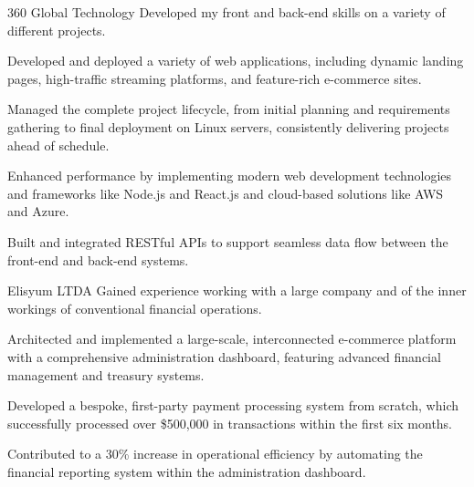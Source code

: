 \begin{experience}{360 Global Technology}{
}
Developed my front and back-end skills on a variety of different projects.\\
\begin{contribs}
	\item{Developed and deployed a variety of web applications, including dynamic landing pages, high-traffic streaming platforms, and feature-rich e-commerce sites.}
	\item{Managed the complete project lifecycle, from initial planning and requirements gathering to final deployment on Linux servers, consistently delivering projects ahead of schedule.}
	\item{Enhanced performance by implementing modern web development technologies and frameworks like Node.js and React.js and cloud-based solutions like AWS and Azure.}
	\item{Built and integrated RESTful APIs to support seamless data flow between the front-end and back-end systems.}
\end{contribs}

\end{experience}

\begin{experience}[last]{Elisyum LTDA}{
}
Gained experience working with a large company and of the inner workings of conventional financial operations.\\
\begin{contribs}
	\item{Architected and implemented a large-scale, interconnected e-commerce platform with a comprehensive administration dashboard, featuring advanced financial management and treasury systems.}
	\item{Developed a bespoke, first-party payment processing system from scratch, which successfully processed over \$500,000 in transactions within the first six months.}
	\item{Contributed to a 30\% increase in operational efficiency by automating the financial reporting system within the administration dashboard.}
\end{contribs}

\end{experience}
